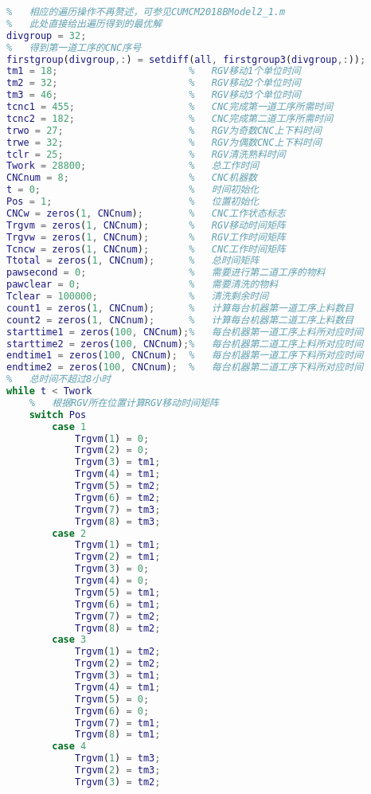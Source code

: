 \documentclass[no-math,withoutpreface,bwprint]{cumcmthesis} %
\numberwithin{equation}{section}
\numberwithin{figure}{section}
\numberwithin{table}{section}
\begin{document}
\begin{lstlisting}[language=matlab]
%   对（5,3）分组的每种情况进行遍历
%   相应的遍历操作不再赘述，可参见CUMCM2018BModel2_1.m
%   此处直接给出遍历得到的最优解
divgroup = 32;
%   得到第一道工序的CNC序号
firstgroup(divgroup,:) = setdiff(all, firstgroup3(divgroup,:));
tm1 = 18;                       %   RGV移动1个单位时间
tm2 = 32;                       %   RGV移动2个单位时间
tm3 = 46;                       %   RGV移动3个单位时间
tcnc1 = 455;                    %   CNC完成第一道工序所需时间
tcnc2 = 182;                    %   CNC完成第二道工序所需时间
trwo = 27;                      %   RGV为奇数CNC上下料时间
trwe = 32;                      %   RGV为偶数CNC上下料时间
tclr = 25;                      %   RGV清洗熟料时间
Twork = 28800;                  %   总工作时间
CNCnum = 8;                     %   CNC机器数
t = 0;                          %   时间初始化
Pos = 1;                        %   位置初始化
CNCw = zeros(1, CNCnum);        %   CNC工作状态标志
Trgvm = zeros(1, CNCnum);      	%   RGV移动时间矩阵
Trgvw = zeros(1, CNCnum);       %   RGV工作时间矩阵
Tcncw = zeros(1, CNCnum);       %   CNC工作时间矩阵
Ttotal = zeros(1, CNCnum);      %   总时间矩阵
pawsecond = 0;                  %   需要进行第二道工序的物料
pawclear = 0;                   %   需要清洗的物料
Tclear = 100000;                %   清洗剩余时间
count1 = zeros(1, CNCnum);      %   计算每台机器第一道工序上料数目
count2 = zeros(1, CNCnum);      %   计算每台机器第二道工序上料数目
starttime1 = zeros(100, CNCnum);%   每台机器第一道工序上料所对应时间
starttime2 = zeros(100, CNCnum);%   每台机器第二道工序上料所对应时间
endtime1 = zeros(100, CNCnum);  %   每台机器第一道工序下料所对应时间
endtime2 = zeros(100, CNCnum);  %   每台机器第二道工序下料所对应时间
%   总时间不超过8小时
while t < Twork
    %   根据RGV所在位置计算RGV移动时间矩阵
    switch Pos
        case 1
            Trgvm(1) = 0;
            Trgvm(2) = 0;
            Trgvm(3) = tm1;
            Trgvm(4) = tm1;
            Trgvm(5) = tm2;
            Trgvm(6) = tm2;
            Trgvm(7) = tm3;
            Trgvm(8) = tm3;
        case 2
            Trgvm(1) = tm1;
            Trgvm(2) = tm1;
            Trgvm(3) = 0;
            Trgvm(4) = 0;
            Trgvm(5) = tm1;
            Trgvm(6) = tm1;
            Trgvm(7) = tm2;
            Trgvm(8) = tm2;               
        case 3
            Trgvm(1) = tm2;
            Trgvm(2) = tm2;
            Trgvm(3) = tm1;
            Trgvm(4) = tm1;
            Trgvm(5) = 0;
            Trgvm(6) = 0;
            Trgvm(7) = tm1;
            Trgvm(8) = tm1;
        case 4
            Trgvm(1) = tm3;
            Trgvm(2) = tm3;
            Trgvm(3) = tm2;

\end{lstlisting}
\end{document}
